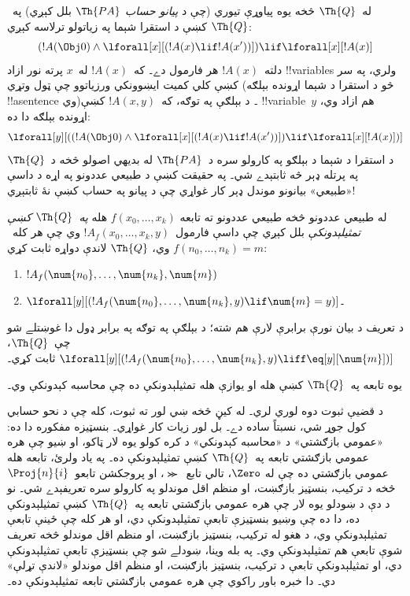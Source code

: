 \documentclass[../../../include/open-logic-section]{subfiles}
\begin{document}
له~$\Th{Q}$ څخه يوه پياوړې تيوري (چې د \emph{پيانو حساب}
$\Th{PA}$ بلل کېږي) په~$\Th{Q}$ کښې د استقرا شېما په زياتولو
ترلاسه کېږي:
\[
(!A(\Obj 0) \land \lforall[x][(!A(x) \lif !A(x'))]) \lif \lforall[x][!A(x)]
\]
دلته~$!A(x)$ هر فارمول دے۔ که~$!A(x)$ له~$x$ پرته نور ازاد
!!{variable}s ولري، په سر کښې کلي کمیت ايښوونکي ورزياتوو چې ټول وتړي
(څو د استقرا د شېما اړونده بېلګه !!a{sentence} وي)۔ د بېلګې په
توګه، که~$!A(x, y)$ کښې !!{variable}~$y$ هم ازاد وي، اړونده بېلګه
دا ده:
\[
\lforall[y][((!A(\Obj 0) \land \lforall[x][(!A(x) \lif !A(x'))]) \lif
  \lforall[x][!A(x)])]
\]
د استقرا د شېما د بېلګو په کارولو سره د~$\Th{PA}$ له بديهي اصولو
څخه د~$\Th{Q}$ په پرتله ډېر څه ثابتېدے شي۔ په حقيقت کښې د طبيعي
عددونو په اړه د داسې «طبيعي» بيانونو موندل ډېر کار غواړي چې د پيانو
په حساب کښې نۀ ثابتېږي!{}

\begin{defn}
  له طبيعي عددونو څخه طبيعي عددونو ته تابعه
  $f(x_0,\ldots,x_k)$ هله \emph{په~$\Th{Q}$ کښې تمثيلېدونکې}
  بلل کېږي چې داسې فارمول~$!A_f(x_0,\dots,x_k,y)$ وي چې هر
  کله~$f(n_0,\dots,n_k) = m$ وي، $\Th{Q}$ لاندې دواړه ثابت کړي:
\begin{enumerate}
\item{} $!A_f(\num{n_0}, \dots, \num{n_k}, \num{m})$
\item{} $\lforall[y][(!A_f(\num{n_0}, \dots,
\num{n_k}, y) \lif \num{m} = y)]$۔
\end{enumerate}
\end{defn}

د تعريف د بيان نورې برابرې لارې هم شته؛ د بېلګې په توګه په برابر
ډول دا غوښتلے شو چې~$\Th{Q}$،
$\lforall[y][(!A_f(\num{n_0}, \dots,
\num{n_k}, y) \liff \eq[y][\num{m}])]$ ثابت کړي۔

\begin{thm}
يوه تابعه په~$\Th{Q}$ کښې هله او يوازې هله تمثيلېدونکې ده چې
محاسبه کېدونکې وي۔
\end{thm}

د قضيې ثبوت دوه لوري لري۔ له کيڼ څخه ښي لور ته ثبوت، کله چې د نحو
حسابي کول جوړ شي، نسبتاً ساده دے۔ بل لور زيات کار غواړي۔ بنسټيزه
مفکوره دا ده: «عمومي بازګشتي» د «محاسبه کېدونکي» د کره کولو يوه لار
ټاکو، او ښيو چې هره عمومي بازګشتي تابعه په~$\Th{Q}$ کښې
تمثيلېدونکې ده۔ په ياد ولرئ، تابعه هله عمومي بازګشتي ده چې له
$\Zero$، تالي تابع~$\Succ$، او پروجکشن تابعو~$\Proj{n}{i}$ څخه د
ترکيب، بنسټيز بازګښت، او منظم اقل موندلو په کارولو سره تعريفېدے شي۔
نو د دې د ښودلو يوه لار چې هره عمومي بازګشتي تابعه په~$\Th{Q}$ کښې
تمثيلېدونکې ده، دا ده چې وښيو بنسټيزې تابعې تمثيلېدونکې دي، او هر
کله چې ځينې تابعې تمثيلېدونکې وي، د هغو له ترکيب، بنسټيز بازګښت، او
منظم اقل موندلو څخه تعريف شوې تابعې هم تمثيلېدونکې وي۔ په بله وينا،
ښودلے شو چې بنسټيزې تابعې تمثيلېدونکې دي، او تمثيلېدونکې تابعې د
ترکيب، بنسټيز بازګښت، او منظم اقل موندلو «لاندې تړلې» دي۔ دا خبره
باور راکوي چې هره عمومي بازګشتي تابعه تمثيلېدونکې ده۔
\end{document}
